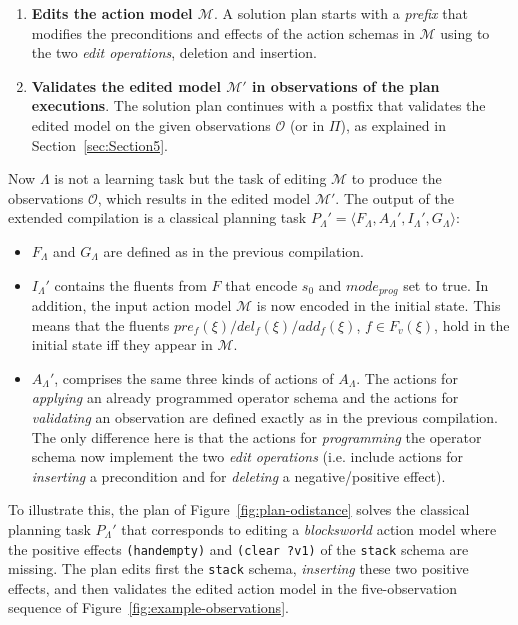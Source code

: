 \documentclass[3p,times]{elsarticle}
\newcommand{\tup}[1]{{\langle #1 \rangle}}
\begin{document}
\begin{enumerate}
\item {\bf Edits the action model $\mathcal{M}$}. A solution plan starts with a {\em prefix} that modifies the preconditions and effects of the action schemas in $\mathcal{M}$ using to the two {\em edit operations}, deletion and insertion.
\item {\bf Validates the edited model $\mathcal{M}'$ in observations of the plan executions}. The solution plan continues with a postfix that validates the edited model on the given observations $\mathcal{O}$ (or in $\Pi$), as explained in Section~\ref{sec:Section5}.
\end{enumerate}

Now $\Lambda$ is not a learning task but the task of editing $\mathcal{M}$ to produce the observations $\mathcal{O}$, which results in the edited model $\mathcal{M}'$. The output of the extended compilation is a classical planning task $P_{\Lambda}'=\tup{F_{\Lambda},A_{\Lambda}',I_{\Lambda}',G_{\Lambda}}$:

\begin{itemize}
\item $F_{\Lambda}$ and $G_{\Lambda}$ are defined as in the previous compilation.
\item $I_{\Lambda}'$ contains the fluents from $F$ that encode $s_0$ and $mode_{prog}$ set to true. In addition, the input action model $\mathcal{M}$ is now encoded in the initial state. This means that the fluents $pre_f(\xi)/del_f(\xi)/add_f(\xi)$, $f\in F_v(\xi)$, hold in the initial state iff they appear in $\mathcal{M}$.
\item $A_{\Lambda}'$, comprises the same three kinds of actions of $A_{\Lambda}$. The actions for {\em applying} an already programmed operator schema and the actions for {\em validating} an observation are defined exactly as in the previous compilation. The only difference here is that the actions for {\em programming} the operator schema now implement the two {\em edit operations} (i.e. include actions for {\em inserting} a precondition and for {\em deleting} a negative/positive effect).
\end{itemize}

To illustrate this, the plan of Figure~\ref{fig:plan-odistance} solves the classical planning task $P_{\Lambda}'$ that corresponds to editing a \emph{blocksworld} action model where the positive effects {\tt\small (handempty)} and {\tt\small (clear ?v1)} of the {\tt\small stack} schema are missing. The plan edits first the {\tt\small stack} schema, {\em inserting} these two positive effects, and then validates the edited action model in the five-observation sequence of Figure~\ref{fig:example-observations}.
\end{document}
